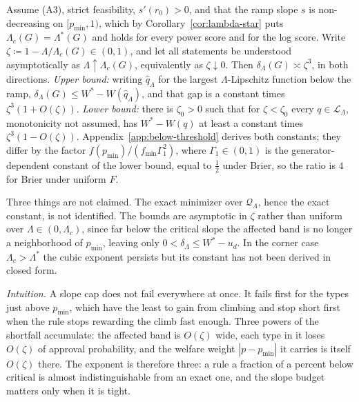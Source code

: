 \documentclass[acmsmall,nonacm,screen]{acmart}
\theoremstyle{acmplain}%
\theoremstyle{acmdefinition}%
\numberwithin{equation}{section}
\begin{document}
\begin{proposition}\label{prop:below-threshold}
Assume (A3), strict feasibility, $s'(r_0) > 0$, and that the ramp slope $s$ is non-decreasing on $[p_{\min},1)$, which by Corollary~\ref{cor:lambda-star} puts $\Lambda_c(G) = \Lambda^*(G)$ and holds for every power score and for the log score. Write $\zeta \coloneqq 1 - \Lambda/\Lambda_c(G) \in (0,1)$, and let all statements be understood asymptotically as $\Lambda \uparrow \Lambda_c(G)$, equivalently as $\zeta \downarrow 0$. Then $\delta_\Lambda(G) \asymp \zeta^3$, in both directions. \emph{Upper bound:} writing $\hat q_\Lambda$ for the largest $\Lambda$-Lipschitz function below the ramp, $\delta_\Lambda(G) \le W^* - W(\hat q_\Lambda)$, and that gap is a constant times $\zeta^3(1 + O(\zeta))$. \emph{Lower bound:} there is $\zeta_0 > 0$ such that for $\zeta < \zeta_0$ every $q \in \mathcal L_\Lambda$, monotonicity not assumed, has $W^* - W(q)$ at least a constant times $\zeta^3(1 - O(\zeta))$. Appendix~\ref{app:below-threshold} derives both constants; they differ by the factor $f(p_{\min})/(f_{\min}\Gamma_1^2)$, where $\Gamma_1 \in (0,1)$ is the generator-dependent constant of the lower bound, equal to $\tfrac12$ under Brier, so the ratio is $4$ for Brier under uniform $F$.
\end{proposition}

Three things are not claimed. The exact minimizer over $\mathcal Q_\Lambda$, hence the exact constant, is not identified. The bounds are asymptotic in $\zeta$ rather than uniform over $\Lambda \in (0,\Lambda_c)$, since far below the critical slope the affected band is no longer a neighborhood of $p_{\min}$, leaving only $0 < \delta_\Lambda \le W^* - u_d$. In the corner case $\Lambda_c > \Lambda^*$ the cubic exponent persists but its constant has not been derived in closed form.

\emph{Intuition.} A slope cap does not fail everywhere at once. It fails first for the types just above $p_{\min}$, which have the least to gain from climbing and stop short first when the rule stops rewarding the climb fast enough. Three powers of the shortfall accumulate: the affected band is $O(\zeta)$ wide, each type in it loses $O(\zeta)$ of approval probability, and the welfare weight $|p - p_{\min}|$ it carries is itself $O(\zeta)$ there. The exponent is therefore three: a rule a fraction of a percent below critical is almost indistinguishable from an exact one, and the slope budget matters only when it is tight.
\end{document}
